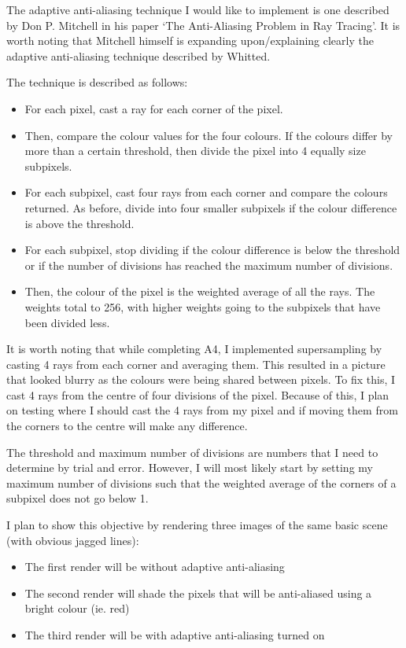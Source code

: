 \documentclass {article}
\begin{document}
\begin{description}
\begin{itemize}
	The adaptive anti-aliasing technique I would like to implement is one described by Don P. Mitchell in his paper `The Anti-Aliasing Problem in Ray Tracing'. It is worth noting that Mitchell himself is expanding upon/explaining clearly the adaptive anti-aliasing technique described by Whitted. \newline
	
	The technique is described as follows:
	
	\begin{itemize}
	\item For each pixel, cast a ray for each corner of the pixel.
	\item Then, compare the colour values for the four colours. If the colours differ by more than a certain threshold, then divide the pixel into 4 equally size subpixels.
	\item For each subpixel, cast four rays from each corner and compare the colours returned. As before, divide into four smaller subpixels if the colour difference is above the threshold.
	\item For each subpixel, stop dividing if the colour difference is below the threshold or if the number of divisions has reached the maximum number of divisions.
	\item Then, the colour of the pixel is the weighted average of all the rays. The weights total to 256, with higher weights going to the subpixels that have been divided less.
	\end{itemize}
	
	\cite{mitchell} \newline
	
	It is worth noting that while completing A4, I implemented supersampling by casting 4 rays from each corner and averaging them. This resulted in a picture that looked blurry as the colours were being shared between pixels. To fix this, I cast 4 rays from the centre of four divisions of the pixel. Because of this, I plan on testing where I should cast the 4 rays from my pixel and if moving them from the corners to the centre will make any difference. \newline
	
	The threshold and maximum number of divisions are numbers that I need to determine by trial and error. However, I will most likely start by setting my maximum number of divisions such that the weighted average of the corners of a subpixel does not go below 1. \newline
	
	I plan to show this objective by rendering three images of the same basic scene (with obvious jagged lines):
	\begin{itemize}
	\item The first render will be without adaptive anti-aliasing
	\item The second render will shade the pixels that will be anti-aliased using a bright colour (ie. red)
	\item The third render will be with adaptive anti-aliasing turned on
	\end{itemize}
	

\end{itemize}
\end{description}
\end{document}
